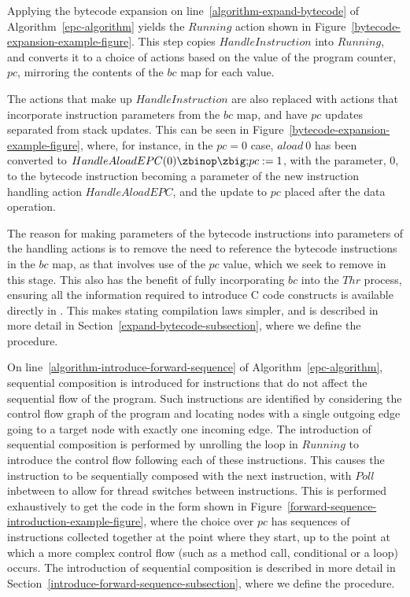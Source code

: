 Applying the bytecode expansion on
line~\ref{algorithm-expand-bytecode} of Algorithm~\ref{epc-algorithm}
yields the $Running$ action shown in
Figure~\ref{bytecode-expansion-example-figure}.
This step copies $HandleInstruction$ into $Running$, and converts it
to a choice of actions based on the value of the program counter,
$pc$, mirroring the contents of the $bc$ map for each value.

The actions that make up $HandleInstruction$ are also replaced with
actions that incorporate instruction parameters from the $bc$ map, and
have $pc$ updates separated from stack updates.
This can be seen in Figure~\ref{bytecode-expansion-example-figure},
where, for instance, in the $pc = 0$ case, $aload~0$ has been
converted to $HandleAloadEPC(0) \circseq pc := 1$, with the parameter,
$0$, to the bytecode instruction becoming a parameter of the new
instruction handling action $HandleAloadEPC$, and the update to $pc$
placed after the data operation.

The reason for making parameters of the bytecode instructions into
parameters of the handling actions is to remove the need to reference
the bytecode instructions in the $bc$ map, as that involves use of the
$pc$ value, which we seek to remove in this stage.
This also has the benefit of fully incorporating $bc$ into the $Thr$
process, ensuring all the information required to introduce C code
constructs is available directly in \Circus{}.
This makes stating compilation laws simpler, and is described in more
detail in Section~\ref{expand-bytecode-subsection}, where we define
the  procedure.

On line~\ref{algorithm-introduce-forward-sequence} of
Algorithm~\ref{epc-algorithm}, sequential composition is introduced
for instructions that do not affect the sequential flow of the
program.
Such instructions are identified by considering the control flow graph
of the program and locating nodes with a single outgoing edge going to
a target node with exactly one incoming edge.
The introduction of sequential composition is performed by unrolling
the loop in $Running$ to introduce the control flow following each of
these instructions.
This causes the instruction to be sequentially composed with the next
instruction, with $Poll$ inbetween to allow for thread switches
between instructions.
This is performed exhaustively to get the code in the form shown in
Figure~\ref{forward-sequence-introduction-example-figure}, where the
choice over $pc$ has sequences of instructions collected together at
the point where they start, up to the point at which a more complex
control flow (such as a method call, conditional or a loop) occurs.
%
The introduction of sequential composition is described in more
detail in Section~\ref{introduce-forward-sequence-subsection}, where
we define the  procedure.

